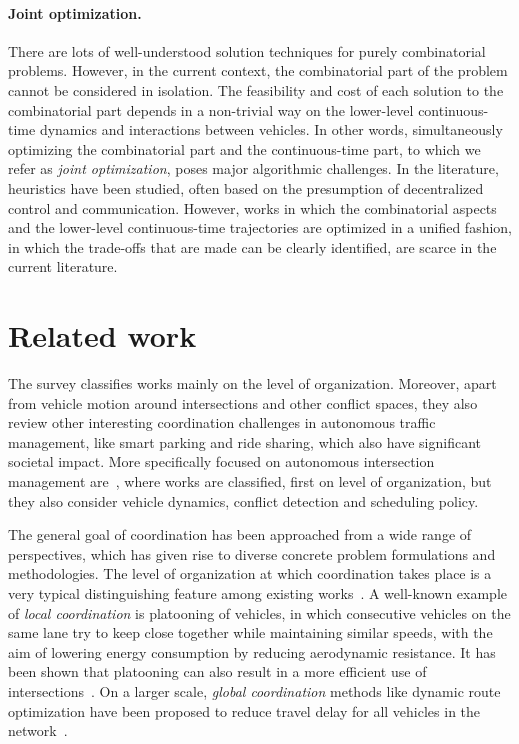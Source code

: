 \documentclass[a4paper]{report}
\theoremstyle{definition}
\theoremstyle{plain}
\begin{document}
\paragraph{Joint optimization.}

There are lots of well-understood solution techniques for purely combinatorial
problems.
%
However, in the current context, the combinatorial part of the problem cannot be
considered in isolation. The feasibility and cost of each solution to the
combinatorial part depends in a non-trivial way on the lower-level
continuous-time dynamics and interactions between vehicles.
%
In other words, simultaneously optimizing the combinatorial part and the
continuous-time part, to which we refer as \emph{joint optimization}, poses
major algorithmic challenges.
%
In the literature, heuristics have been studied, often based on the presumption
of decentralized control and communication.
%
However, works in which the combinatorial aspects and the lower-level
continuous-time trajectories are optimized in a unified fashion, in which the
trade-offs that are made can be clearly identified, are scarce in the current
literature.


\section{Related work}

The survey \cite{marianiCoordinationAutonomousVehicles2022} classifies works
mainly on the level of organization. Moreover, apart from vehicle motion around
intersections and other conflict spaces, they also review other interesting
coordination challenges in autonomous traffic management, like smart parking and
ride sharing, which also have significant societal impact.
%
More specifically focused on autonomous intersection management
are~\cite{khayatianSurveyIntersectionManagement2020}, where works are
classified, first on level of organization, but they also consider vehicle
dynamics, conflict detection and scheduling policy.

% 
The general goal of coordination has been approached from a wide range of
perspectives, which has given rise to diverse concrete problem formulations and
methodologies.
%
The level of organization at which coordination takes place is a very typical
distinguishing feature among existing
works~\cite{marianiCoordinationAutonomousVehicles2022}.
%
A well-known example of \emph{local coordination} is platooning of vehicles, in
which consecutive vehicles on the same lane try to keep close together while
maintaining similar speeds, with the aim of lowering energy consumption by
reducing aerodynamic resistance. It has been shown that platooning can also
result in a more efficient use of
intersections~\cite{miculescuPollingsystemsbasedAutonomousVehicle2016,tachetRevisitingStreetIntersections2016,timmermanPlatoonFormingAlgorithms2021}.
On a larger scale, \emph{global coordination} methods like dynamic route
optimization have been proposed to reduce travel delay for all vehicles in the
network~\cite{rossiRoutingAutonomousVehicles2018}.
\end{document}
